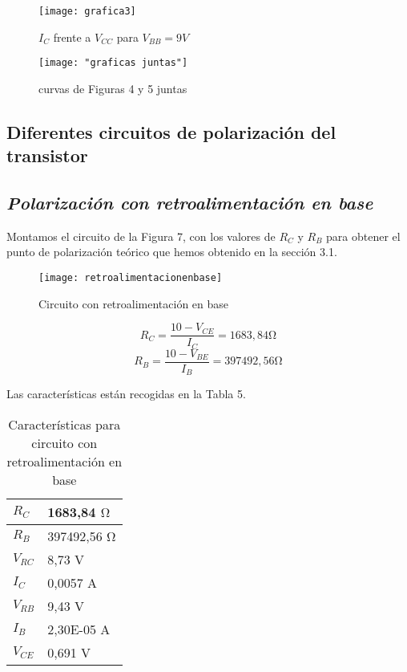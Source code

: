 \documentclass[a4paper,12pt,spanish]{article}
\begin{document}
\begin{figure}[H]
	\centering
	\texttt{[image: grafica3]}
	\caption{$I_C$ frente a $V_{CC}$ para $V_{BB} = 9\si{V}$}
	\label{fig:grafica3}
\end{figure}

\begin{figure}[H]
	\centering
	\texttt{[image: "graficas juntas"]}
	\caption{curvas de Figuras 4 y 5 juntas}
	\label{fig:graficas-juntas}
\end{figure}



\subsection{Diferentes circuitos de polarización del transistor}

\subsection*{\textit{Polarización con retroalimentación en base}}

Montamos el circuito de la Figura 7, con los valores de $R_C$ y $R_B$ para obtener el punto de polarización teórico que hemos obtenido en la sección 3.1.


\begin{figure}[H]
	\centering
	\texttt{[image: retroalimentacionenbase]}
	\caption{Circuito con retroalimentación en base}
	\label{fig:retroalimentacionenbase}
\end{figure}

\[R_C = \frac{10- V_{CE}}{I_C} = 1683,84 \si{\ohm} \]
\[R_B = \frac{10- V_{BE}}{I_B} = 397492,56\si{\ohm} \]

Las características están recogidas en la Tabla 5.


\begin{table}[H]
	\centering
	\begin{tabular}{|l|l|}
		\hline
		$R_C$  & 1683,84 $\si{\ohm}$  \\ \hline
		$R_B$    & 397492,56   $\si{\ohm}$    \\ \hline
		$V_{RC}$ & 8,73   V   \\ \hline
		$I_C$    & 0,0057  A  \\ \hline
		$V_{RB}$ & 9,43    V  \\ \hline
		$I_B$    & 2,30E-05 A \\ \hline
		$V_{CE}$ & 0,691   V  \\ \hline
	\end{tabular}
	\caption{Características para circuito con retroalimentación en base}
	\label{tab:my-table}
\end{table}
\end{document}
